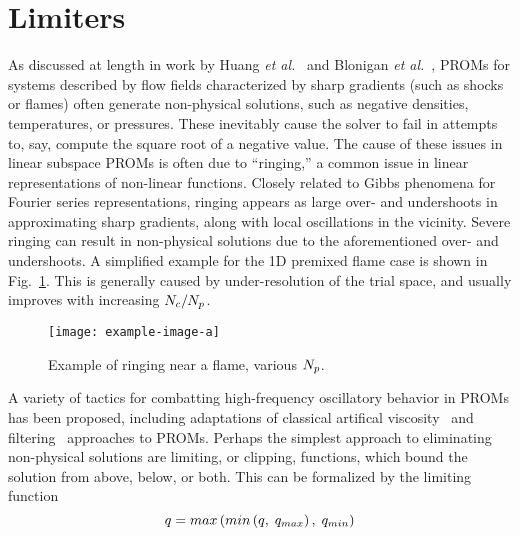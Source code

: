 \section{Limiters}\label{sec:limiters}

As discussed at length in work by Huang \textit{et al.}~\cite{Huang2019} and Blonigan \textit{et al.}~\cite{Blonigan2020}, PROMs for systems described by flow fields characterized by sharp gradients (such as shocks or flames) often generate non-physical solutions, such as negative densities, temperatures, or pressures. These inevitably cause the solver to fail in attempts to, say, compute the square root of a negative value. The cause of these issues in linear subspace PROMs is often due to ``ringing,'' a common issue in linear representations of non-linear functions. Closely related to Gibbs phenomena for Fourier series representations, ringing appears as large over- and undershoots in approximating sharp gradients, along with local oscillations in the vicinity. Severe ringing can result in non-physical solutions due to the aforementioned over- and undershoots. A simplified example for the 1D premixed flame case is shown in Fig.~\ref{fig:limitRingingEx}. This is generally caused by under-resolution of the trial space, and usually improves with increasing $N_c/N_p$.

\begin{figure}
    \centering
    \texttt{[image: example-image-a]}
    \caption{\label{fig:limitRingingEx}Example of ringing near a flame, various $N_p$.}
\end{figure}

A variety of tactics for combatting high-frequency oscillatory behavior in PROMs has been proposed, including adaptations of classical artifical viscosity~\cite{Sirisup2004,San2013} and filtering~\cite{Ardag2011,Wells2017} approaches to PROMs. Perhaps the simplest approach to eliminating non-physical solutions are limiting, or clipping, functions, which bound the solution from above, below, or both. This can be formalized by the limiting function 
%
\begin{equation}
    q = max\left(min\left(q, \; q_{max}\right), \; q_{min}\right)
\end{equation}
%

